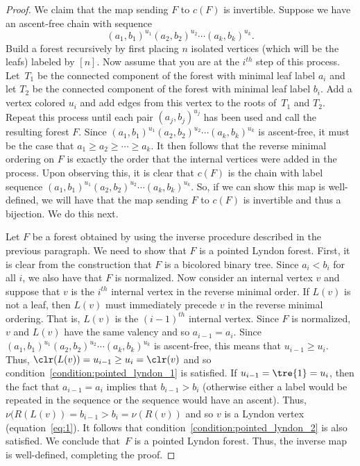 \begin{proof}
  We claim that the map sending $F$ to $c(F)$ is invertible.  Suppose we have an ascent-free chain with sequence 
  $$
  (a_1,b_1)^{u_1}(a_2,b_2)^{u_2}\cdots (a_{k},b_{k})^{u_{k}}.
  $$
  Build a forest recursively by first  placing $n$ isolated vertices (which will be the leafs) labeled by $[n]$. Now assume that you are at the $i^{th}$ step of this process.    Let~$T_1$ be the connected component of the forest with minimal leaf label $a_i$ and let $T_2$ be the connected component of the forest with minimal leaf label $b_i$.  Add a vertex colored $u_i$  and add edges from this vertex to the roots of~$T_1$ and $T_2$.   Repeat this process until each pair $(a_j,b_j)^{u_j}$ has been used and call the resulting forest $F$. Since $  (a_1,b_1)^{u_1}(a_2,b_2)^{u_2}\cdots (a_{k},b_{k})^{u_{k}}$ is ascent-free, it must be the case that $a_1\geq a_2\geq \cdots \geq a_k$.  It then follows that the reverse minimal ordering on $F$ is exactly the order that the internal vertices were added in the process. Upon observing this, it is clear that $c(F)$ is  the chain with label  sequence $(a_1,b_1)^{u_1}(a_2,b_2)^{u_2}\cdots (a_{k},b_{k})^{u_{k}}$. So, if we can show this map is well-defined, we will have that the map sending $F$ to $c(F)$ is invertible and thus a bijection.  We do this next.

  
  Let $F$ be a forest obtained by using the inverse procedure described in the previous paragraph. We need to show that $F$ is  a pointed Lyndon forest. First, it is clear from the construction that $F$ is a bicolored binary tree.  Since $a_i<b_i$ for all $i$, we also have that $F$ is  normalized.  Now consider an internal vertex $v$  and suppose that $v$ is the $i^{th}$ internal vertex in the reverse minimal order.  If $L(v)$ is not  a leaf,  then $L(v)$ must immediately precede $v$ in the  reverse minimal ordering.  That is, $L(v)$ is the $(i-1)^{th}$ internal vertex.  Since $F$ is normalized, $v$ and $L(v)$ have the same valency and so $a_{i-1} = a_{i}$.  Since $(a_1,b_1)^{u_1}(a_2,b_2)^{u_2}\cdots (a_{k},b_{k})^{u_{k}}$ is ascent-free, this means that $u_{i-1} \geq u_{i}$.  Thus, $\clr(L(v)) =u_{i-1} \geq u_i=\clr(v)$ and so condition~\eqref{condition:pointed_lyndon_1} is satisfied.  If $u_{i-1} =\tre{1} = u_{i}$, then the fact that $a_{i-1} = a_{i}$ implies that $b_{i-1}>b_i$ (otherwise either a label would be repeated in the sequence or the sequence would have an ascent).  Thus, 
  $\nu(R(L(v))= b_{i-1} > b_i = \nu(R(v))$ and so $v$ is a Lyndon vertex (equation~\eqref{eq:1}).  It follows that condition~\eqref{condition:pointed_lyndon_2} is also satisfied. We conclude that~$F$ is a pointed Lyndon forest.  Thus, the inverse map is well-defined, completing the proof.
  \end{proof}

